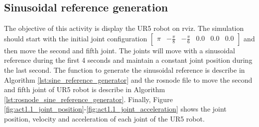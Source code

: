 \subsection{Sinusoidal reference generation}
The objective of this activity is display the UR5 robot on rviz. The simulation should start with the   initial joint configuration $\begin{bmatrix} \pi & -\frac{\pi}{8} & -\frac{\pi}{6} & 0.0 & 0.0 & 0.0 \end{bmatrix}$ and then move the second and fifth joint. The joints will move with a sinusoidal reference during the first 4 seconds and maintain a constant joint position during the last second. The function to generate the sinusoidal reference is describe in Algorithm \ref{lst:sine_reference_generator} and the rosnode file to move the second and fifth joint of UR5 robot is describe in Algorithm \ref{lst:rosnode_sine_reference_generator}. Finally, Figure \ref{fig:act1.1_joint_position}-\ref{fig:act1.1_joint_acceleration} shows the joint position, velocity and acceleration of each joint of the UR5 robot.

